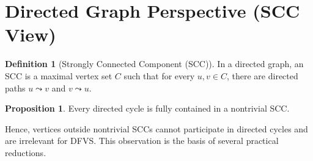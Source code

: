 \documentclass[10pt,a4paper]{report}
\theoremstyle{definition}
\newtheorem{definition}{Definition}[chapter]
\newtheorem{theorem}{Theorem}[chapter]
\newtheorem{proposition}[theorem]{Proposition}
\newcommand{\fvs}{\textsc{FVS}}
\newcommand{\dfvs}{\textsc{DFVS}}
\newcommand{\bigO}[1]{\mathcal{O}\!\left(#1\right)}
\begin{document}
\section{Directed Graph Perspective (SCC View)}

\begin{definition}[Strongly Connected Component (SCC)]
	In a directed graph, an SCC is a maximal vertex set $C$ such that for every $u,v\in C$, there are directed paths $u\leadsto v$ and $v\leadsto u$.
\end{definition}

\begin{proposition}
	Every directed cycle is fully contained in a nontrivial SCC.
\end{proposition}

Hence, vertices outside nontrivial SCCs cannot participate in directed cycles and are irrelevant for \dfvs{}. This observation is the basis of several practical reductions.





\end{document}
